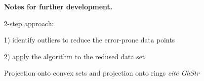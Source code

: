 \label{chapter:socp}

\textbf{Notes for further development.}

2-step approach:

1) identify outliers to reduce the error-prone data points

2) apply the algorithm  to the redused data set

Projection onto convex sets and projection onto rings \textit{cite GhStr}